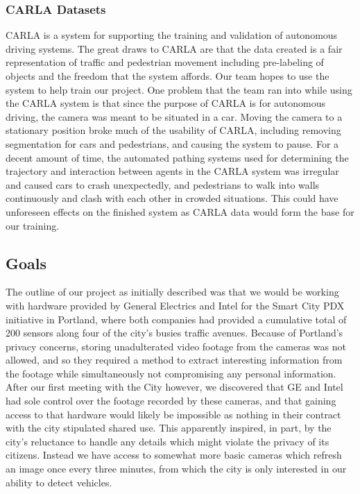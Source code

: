 \subsubsection{CARLA Datasets}
CARLA is a system for supporting the training and validation of  autonomous driving systems. The great draws to CARLA are that the data created is a fair representation of traffic and pedestrian movement including pre-labeling of objects and the freedom that the system affords. Our team hopes to use the system to help train our project.
One problem that the team ran into while using the CARLA system is that since the purpose of CARLA is for autonomous driving, the camera was meant to be situated in a car. Moving the camera to a stationary position broke much of the usability of CARLA, including removing segmentation for cars and pedestrians, and causing the system to pause. 
For a decent amount of time, the automated pathing systems used for determining the trajectory and interaction between agents in the CARLA system was irregular and caused cars to crash unexpectedly, and pedestrians to walk into walls continuously and clash with each other in crowded situations. This could have unforeseen effects on the finished system as CARLA data would form the base for our training.

\subsection{Goals}
The outline of our project as initially described was that we would be working with hardware provided by General Electrics and Intel for the Smart City PDX initiative in Portland, where both companies had provided a cumulative total of 200 sensors along four of the city’s busies traffic avenues. Because of Portland’s privacy concerns, storing unadulterated video footage from the cameras was not allowed, and so they required a method to extract interesting information from the footage while simultaneously not compromising any personal information. After our first meeting with the City however, we discovered that GE and Intel had sole control over the footage recorded by these cameras, and that gaining access to that hardware would likely be impossible as nothing in their contract with the city stipulated shared use. This apparently inspired, in part, by the city’s reluctance to handle any details which might violate the privacy of its citizens. Instead we have access to somewhat more basic cameras which refresh an image once every three minutes, from which the city is only interested in our ability to detect vehicles.

